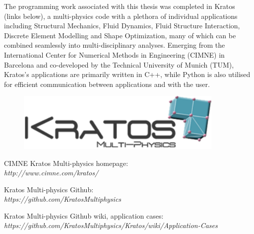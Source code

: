 The programming work associated with this thesis was completed in Kratos (links below), a multi-physics code with a plethora of individual applications including Structural Mechanics, Fluid Dynamics, Fluid Structure Interaction, Discrete Element Modelling and Shape Optimization, many of which can be combined seamlessly into multi-disciplinary analyses. Emerging from the International Center for Numerical Methods in Engineering (CIMNE) in Barcelona and co-developed by the Technical University of Munich (TUM), Kratos's applications are primarily written in C++, while Python is also utilised for efficient communication between applications and with the user.

\vspace*{10mm}

\begin{figure}[H]
	\centering
	\def\svgwidth{\columnwidth}
	\includegraphics[width=10cm]{images/kratoslogo.png}
	\label{kratoslogo}
\end{figure}

\begin{center}
CIMNE Kratos Multi-physics homepage: \\
\textit{http://www.cimne.com/kratos/}

Kratos Multi-physics Github: \\
\textit{https://github.com/KratosMultiphysics}

Kratos Multi-physics Github wiki, application cases: \\
 \textit{https://github.com/KratosMultiphysics/Kratos/wiki/Application-Cases}
\end{center}